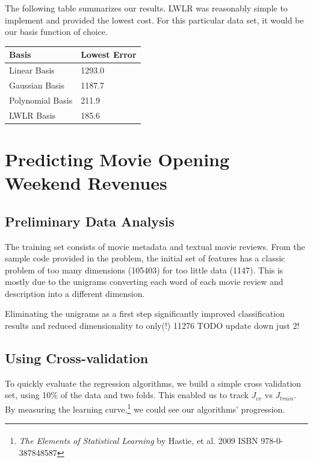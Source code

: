 \documentclass[11pt, oneside]{article}   	%
\begin{document}
The following table summarizes our results. LWLR was reasonably simple to implement and provided the lowest cost. For this particular data set, it would be our basis function of choice.

\begin{center}
    \begin{tabular}{| l | l |}
    \hline
    Basis & Lowest Error \\ \hline
    Linear Basis & \hfill 1293.0 \\
    Gaussian Basis & \hfill 1187.7 \\
    Polynomial Basis & \hfill 211.9 \\
    LWLR Basis & \hfill 185.6 \\
    \hline
    \end{tabular}
\end{center}


\section*{Predicting Movie Opening Weekend Revenues}


\subsection*{Preliminary Data Analysis}

The training set consists of movie metadata and textual movie reviews. From the sample code provided in the problem, the initial set of features has a classic problem of too many dimensions (105403) for too little data (1147).  This is mostly due to the unigrams converting each word of each movie review and description into a different dimension.

Eliminating the unigrams as a first step significantly improved classification results and reduced dimensionality to only(!) 11276 TODO update down just 2!

\subsection*{Using Cross-validation}

To quickly evaluate the regression algorithms, we build a simple cross validation set, using 10\% of the data and two folds. This enabled us to track $J_{cv}$ vs $J_{train}$. By measuring the learning curve,\footnote{\emph{The Elements of Statistical Learning} by Hastie, et al. \textsuperscript{\textcopyright} 2009 ISBN 978-0-387848587} we could see our algorithms' progression.
\end{document}
